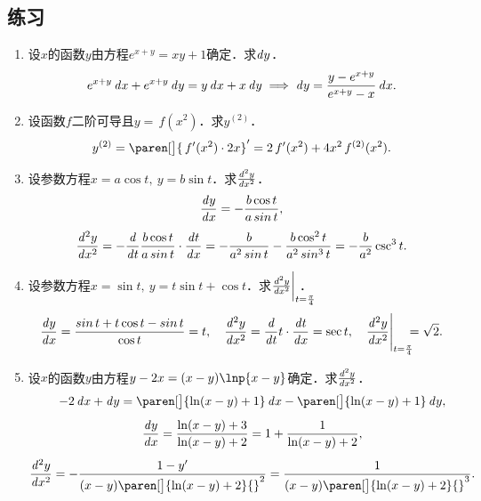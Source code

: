 \ifshowex
{}
\subsection*{练习}

\begin{enumerate}
\item 设\(x\)的函数\(y\)由方程\(e^{x+y} = xy + 1\)确定．求\(\dy\)．
  \ifshowsol
    \begin{equation*}
      e^{x+y} \dx + e^{x+y} \dy
      = y \dx + x \dy
      \implies
      \dy = \frac{y-e^{x+y}}{e^{x+y}-x} \dx.
    \end{equation*}
  \fi

\item 设函数\(f\)二阶可导且\(y = \,f(x^2)\)．求\(y^{(2)}\)．
  \ifshowsol
    \begin{equation*}
      y^{(2)}
      = \paren[\big]{\,f'(x^2) \cdot 2x}'
      = 2\,f'(x^2) + 4x^2\,f^{(2)}(x^2).
    \end{equation*}
  \fi

\item 设参数方程\(x = a \cos t,\ y = b \sin t\)．求\(\ddn[y]x2\)．
  \ifshowsol
    \begin{gather*}
      \dydx = - \frac{b \cos t}{a \sin t}, \\[1ex]
      \ddn[y]x2
      = - \ddt \frac{b \cos t}{a \sin t} \cdot \dd[t]x
      = - \frac{b}{a^2 \sin t} - \frac{b \cos^2 t}{a^2 \sin^3 t}
      = - \frac{b}{a^2} \csc^3 t.
    \end{gather*}
  \fi

\item 设参数方程\(x = \sin t,\ y = t \sin t + \cos t\)．求\(\ddn[y]x2 \bigg\vert_{t=\frac\pi4}\mkern-24mu\)．
  \ifshowsol
    \begin{equation*}
      \dydx = \frac{\sin t + t \cos t - \sin t}{\cos t} = t,
      \quad
      \ddn[y]x2 = \ddt t \cdot \dd[t]x = \sec t,
      \quad
      \ddn[y]x2 \Bigg\vert_{t=\frac\pi4} \mkern-11mu = \sqrt2.
    \end{equation*}
  \fi

\item 设\(x\)的函数\(y\)由方程\(y - 2x = (x-y) \lnp{x-y}\)确定．求\(\ddn[y]x2\)．
  \ifshowsol
    \begin{gather*}
      -2\dx + \dy
      = \paren[\big]{\ln(x-y) + 1} \dx - \paren[\big]{\ln(x-y) + 1} \dy, \\[1ex]
      \dydx = \frac{\ln(x-y)+3}{\ln(x-y)+2} = 1 + \frac{1}{\ln(x-y)+2}, \\[1ex]
      \ddn[y]x2
      = - \frac{1-y'}{(x-y)\paren[\big]{\ln(x-y)+2}{}^2}
      = \frac{1}{(x-y)\paren[\big]{\ln(x-y)+2}{}^3}.
    \end{gather*}
  \fi


\end{enumerate}
